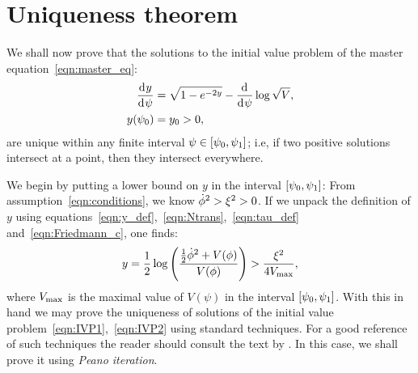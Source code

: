 \section{Uniqueness theorem}
\label{sec:uniqueness_theorem}
We shall now prove that the solutions to the initial value problem of the master equation~\eqref{eqn:master_eq}:
\begin{align}
  \frac{\operatorname{d}^{}\!{y}}{\operatorname{d}^{}\!{\psi}}
  &=
  \sqrt{1-e^{-2y}} - \frac{\operatorname{d}^{}\!{}}{\operatorname{d}^{}\!{\psi}}\log \sqrt V,
  \label{eqn:IVP1}
  \\
  y(\psi_0)
  &=
  y_0>0
  \label{eqn:IVP2},
\end{align}
are unique within any finite interval \(\psi\in[\psi_0,\psi_1]\); i.e, if two positive solutions intersect at a point, then they intersect
everywhere.

We begin by putting a lower bound on \(y\) in the interval \([\psi_0,\psi_1]\): From assumption~\eqref{eqn:conditions}, we know \(\dot{\phi}^2>\xi^2>0\). If we unpack the definition of \(y\) using equations~\eqref{eqn:y_def},~\eqref{eqn:Ntrans},~\eqref{eqn:tau_def} and~\eqref{eqn:Friedmann_c}, one finds:
\begin{equation}
  y 
  = 
  \frac{1}{2}\log
  \left(\frac{\frac{1}{2}\dot{\phi}^2 + V(\phi)}{V(\phi)}\right) 
  > 
  \frac{\xi^2}{4V_\mathrm{max}},
\end{equation}
where \(V_\mathrm{max}\) is the maximal value of \(V(\psi)\) in the interval \([\psi_0,\psi_1]\). With this in hand we may prove the uniqueness of solutions of the initial value problem~\eqref{eqn:IVP1},~\eqref{eqn:IVP2} using standard techniques. For a good reference of such techniques the reader should consult the text by \citet{agarwal_1993}. In this case, we shall prove it using {\em Peano iteration}.


